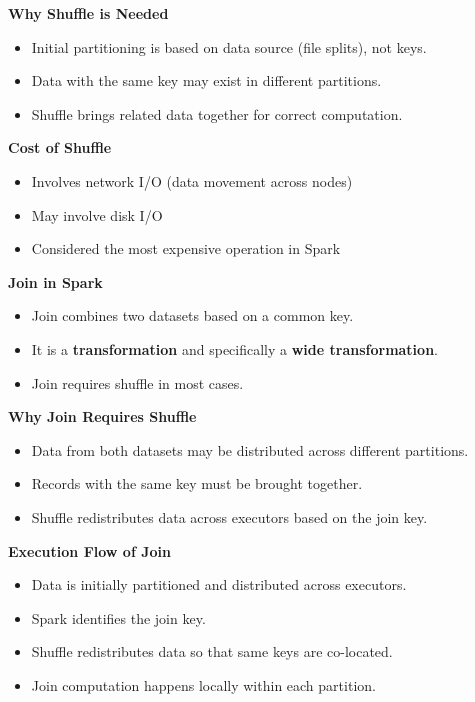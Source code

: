 \documentclass[10pt,a4paper]{article}
\begin{document}
	\textbf{Why Shuffle is Needed}
	\begin{itemize}
	    \item Initial partitioning is based on data source (file splits), not keys.
	    \item Data with the same key may exist in different partitions.
	    \item Shuffle brings related data together for correct computation.
	\end{itemize}
	
	\textbf{Cost of Shuffle}
	\begin{itemize}
	    \item Involves network I/O (data movement across nodes)
	    \item May involve disk I/O
	    \item Considered the most expensive operation in Spark
	\end{itemize}
	
	\textbf{Join in Spark}
	\begin{itemize}
	    \item Join combines two datasets based on a common key.
	    \item It is a \textbf{transformation} and specifically a \textbf{wide transformation}.
	    \item Join requires shuffle in most cases.
	\end{itemize}
	
	\textbf{Why Join Requires Shuffle}
	\begin{itemize}
	    \item Data from both datasets may be distributed across different partitions.
	    \item Records with the same key must be brought together.
	    \item Shuffle redistributes data across executors based on the join key.
	\end{itemize}
	
	\textbf{Execution Flow of Join}
	\begin{itemize}
	    \item Data is initially partitioned and distributed across executors.
	    \item Spark identifies the join key.
	    \item Shuffle redistributes data so that same keys are co-located.
	    \item Join computation happens locally within each partition.
	\end{itemize}
	
\end{document}
